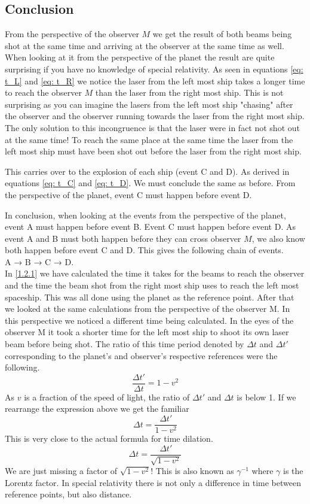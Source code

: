 \documentclass[reprint,english,notitlepage]{revtex4-2}
\begin{document}
  
  
  
  
  \subsection{Conclusion} 
  From the perspective of the observer $ M $ we get the result of both beams being shot at the same time and arriving at the observer at the same time as well. When looking at it from the perspective of the planet the result are quite surprising if you have no knowledge of special relativity. As seen in equations \ref{eq: t_L} and \ref{eq: t_R} we notice the laser from the left most ship takes a longer time to reach the observer $ M $ than the laser from the right most ship. This is not surprising as you can imagine the lasers from the left most ship "chasing" after the observer and the observer running towards the laser from the right most ship. The only solution to this incongruence is that the laser were in fact not shot out at the same time! To reach the same place at the same time the laser from the left most ship must have been shot out before the laser from the right most ship. 
  
  This carries over to the explosion of each ship (event C and D). As derived in equations \ref{eq: t_C} and \ref{eq: t_D}. We must conclude the same as before. From the perspective of the planet, event C must happen before event D. 
  
  In conclusion, when looking at the events from the perspective of the planet, event A must happen before event B. Event C must happen before event D. As event A and B must both happen before they can cross observer $ M $, we also know both happen before event C and D. This gives the following chain of events. \\
  A → B → C → D.\\
  
  In \ref{1.2.1} we have calculated the time it takes for the beams to reach the observer and the time the beam shot from the right most ship uses to reach the left most spaceship. This was all done using the planet as the reference point. After that we looked at the same calculations from the perspective of the observer M. In this perspective we noticed a different time being calculated. In the eyes of the observer M it took a shorter time for the left most ship to shoot its own laser beam before being shot.
  The ratio of this time period denoted by $ Δt $ and $ Δt' $ corresponding to the planet's and observer's respective references were the following.
  \[
  \frac{Δt'}{Δt} = 1 - v^{2}
  \]
  As $ v $ is a fraction of the speed of light, the ratio of $ Δt' $ and $ Δt $ is below 1. If we rearrange the expression above we get the familiar 
  \[
  Δt = \frac{Δt'}{1 - v^{2}}
  \]
  This is very close to the actual formula for time dilation. 
  \[
  Δt = \frac{Δt'}{\sqrt{1 - v^{2}} }
  \]
  We are just missing a factor of $ \sqrt{1 - v^{2}}  $! This is also known as $ γ^{-1} $ where $ γ $ is the Lorentz factor. In special relativity there is not only a difference in time between reference points, but also distance.
\end{document}
